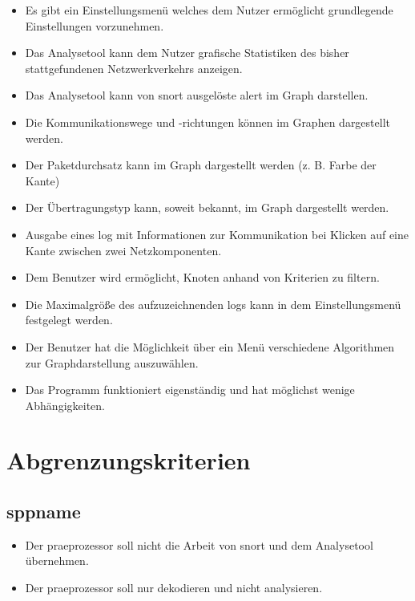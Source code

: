 \begin{itemize}
\item Es gibt ein Einstellungsmenü welches dem Nutzer ermöglicht grundlegende Einstellungen vorzunehmen.

\item Das Analysetool kann dem Nutzer grafische Statistiken des bisher stattgefundenen Netzwerkverkehrs anzeigen.

\item Das Analysetool kann von \gls{snort} ausgelöste \gls{alert} im Graph darstellen.

\item Die Kommunikationswege und -richtungen können im Graphen dargestellt werden.

\item Der Paketdurchsatz kann im Graph dargestellt werden (z. B. Farbe der Kante)

\item Der Übertragungstyp kann, soweit bekannt, im Graph dargestellt werden.

\item Ausgabe eines \gls{log} mit Informationen zur Kommunikation bei Klicken auf eine Kante zwischen zwei Netzkomponenten.

\item Dem Benutzer wird ermöglicht, Knoten anhand von Kriterien zu filtern.

\item Die Maximalgröße des aufzuzeichnenden \glspl{log} kann in dem Einstellungsmenü festgelegt werden.

\item Der Benutzer hat die Möglichkeit über ein Menü verschiedene Algorithmen zur Graphdarstellung auszuwählen.

\item Das Programm funktioniert eigenständig und hat möglichst wenige Abhängigkeiten.
\end{itemize}

\section{Abgrenzungskriterien}

\subsection{\gls{sppname}}
\begin{itemize}
\item Der \gls{praeprozessor} soll nicht die Arbeit von \gls{snort} und dem Analysetool übernehmen.

\item Der \gls{praeprozessor} soll nur dekodieren und nicht analysieren.

\end{itemize}

